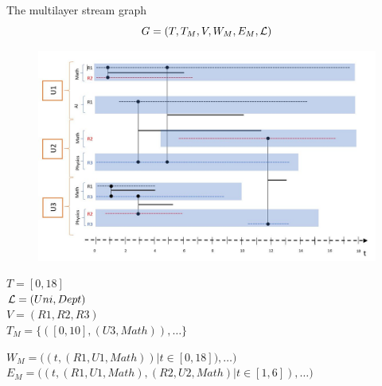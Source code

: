 \documentclass[15pt]{beamer}
\begin{document}
\begin{frame}{The multilayer stream graph}
	\[
		G=(T,T_M,V,W_M,E_M,\cal{L})
	\]
	\begin{minipage}{0.59\linewidth}
		\begin{figure}
    		\centering
    		\includegraphics[width=\linewidth]{img/chercheurs.jpg}
    		\label{fig:chercheurs}
		\end{figure}
	\end{minipage}
	\begin{minipage}{0.4\textwidth}
		\begin{footnotesize}
			$T=[0,18]$\\ \pause
			${\cal L} = (Uni,Dept)$\\ \pause
			$V=(R1,R2,R3)$\\ \pause
			$T_M= \{([0,10],(U3,Math)), \dots \}$
		\end{footnotesize}
	\end{minipage}

	\begin{footnotesize}
		$W_M = \bigg( (t,(R1,U1,Math))| t \in [0,18]), \dots \bigg)$ \pause
		\\
		$E_M= \bigg( (t,(R1,U1,Math),(R2,U2,Math)| t \in [1,6]), \dots \bigg)$ 	
	\end{footnotesize}
\end{frame}
\end{document}
